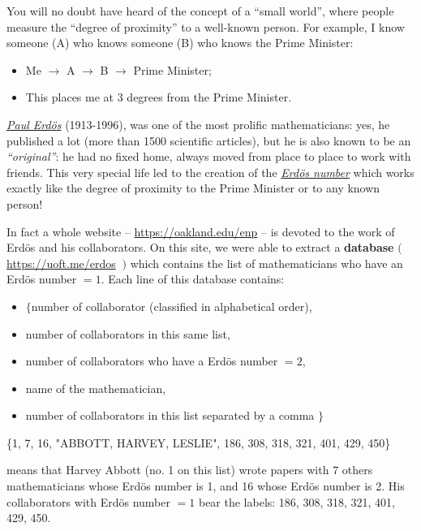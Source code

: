 

You will no doubt have heard of the concept of a ``small world'', where people measure the ``degree of proximity'' to a well-known person. 
For example, I know someone (A) who knows someone (B) who knows the Prime Minister:
\begin{itemize}
	\item Me $\to$ A $\to$ B $\to$ Prime Minister;
	\item This places me at 3 degrees from the Prime Minister.
\end{itemize}



\href{https://www.wikipedia.org/wiki/Paul_Erdos}{\emph{Paul Erd{\"o}s}} (1913-1996), was one of the most prolific mathematicians: yes, he published a lot (more than 1500 scientific articles), but he is also known to be an \emph{``original''}: he had no fixed home, always moved from place to place to work with friends. 
This very special life led to the creation of the \href{https://www.wikipedia.org/wiki/Erdos_number}{\emph{Erd{\"o}s number}} which works exactly like the degree of proximity to the Prime Minister or to any known person! 

\begin{emphbox}[]
In fact a whole website -- \url{https://oakland.edu/enp} -- is devoted to the work of Erd{\"o}s and his collaborators. On this site, we were able to extract a \textbf{\color{Green}database} $\bigg($\url{https://uoft.me/erdos} $\ \bigg)$ which contains the list of mathematicians who have an Erd{\"o}s number $= 1$. 
Each line of this database contains:
\begin{itemize}
	\item $\big\{$number of collaborator (classified in alphabetical order),
	\item number of collaborators in this same list,
	\item number of collaborators who have a Erd{\"o}s number $= 2$,
	\item name of the mathematician, 
	\item number of collaborators in this list separated by a comma $\big\}$
\end{itemize}
\end{emphbox}

\begin{example}
\hfil \{1, 7, 16, "ABBOTT, HARVEY, LESLIE", 186, 308, 318, 321, 401, 429, 450\}

means that Harvey Abbott (no. 1 on this list) wrote papers with 7 others mathematicians whose Erd{\"o}s number is 1, and 16 whose Erd{\"o}s number is 2. His collaborators with Erd{\"o}s number $= 1$ bear the labels: 186, 308, 318, 321, 401, 429, 450. 
\end{example}

